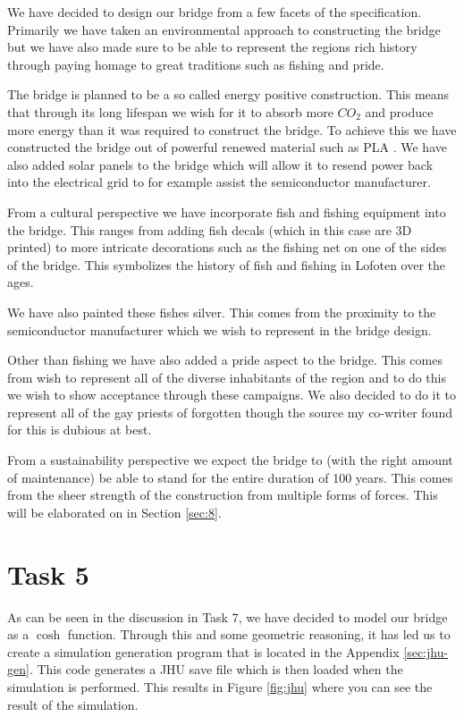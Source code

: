 \documentclass{report}
\begin{document}
We have decided to design our bridge from a few facets of the specification. Primarily we have taken an environmental approach to constructing the bridge but we have also made sure to be able to represent the regions rich history through paying homage to great traditions such as fishing and pride.

The bridge is planned to be a so called energy positive construction. This means that through its long lifespan we wish for it to absorb more $CO_2$ and produce more energy than it was required to construct the bridge. To achieve this we have constructed the bridge out of powerful renewed material such as PLA \cite{wiki:pla}. We have also added solar panels to the bridge which will allow it to resend power back into the electrical grid to for example assist the semiconductor manufacturer.

From a cultural perspective we have incorporate fish and fishing equipment into the bridge. This ranges from adding fish decals (which in this case are 3D printed) to more intricate decorations such as the fishing net on one of the sides of the bridge. This symbolizes the history of fish and fishing in Lofoten over the ages.

We have also painted these fishes silver. This comes from the proximity to the semiconductor manufacturer which we wish to represent in the bridge design.

Other than fishing we have also added a pride aspect to the bridge. This comes from wish to represent all of the diverse inhabitants of the region and to do this we wish to show acceptance through these campaigns. We also decided to do it to represent all of the gay priests of forgotten though the source my co-writer found for this is dubious at best.

From a sustainability perspective we expect the bridge to (with the right amount of maintenance) be able to stand for the entire duration of 100 years. This comes from the sheer strength of the construction from multiple forms of forces. This will be elaborated on in Section \ref{sec:8}.

\section{Task 5}

As can be seen in the discussion in Task 7, we have decided to model our bridge as a $\cosh$ function. Through this and some geometric reasoning, it has led us to create a simulation generation program that is located in the Appendix \ref{sec:jhu-gen}. This code generates a JHU save file which is then loaded when the simulation is performed. This results in Figure \ref{fig:jhu} where you can see the result of the simulation.
\end{document}
